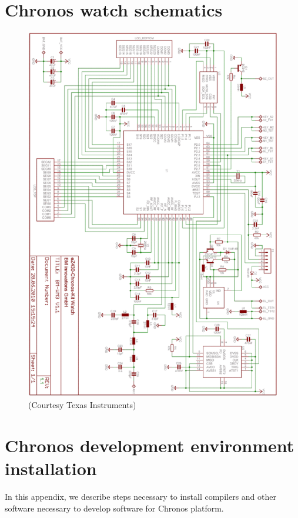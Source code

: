 
\chapter{Chronos watch schematics}
\label{appendix:watch_schematics}

\begin{figure}[h]
  \centering
  \includegraphics[width=1.0\textwidth]{img/watch_schematics.png}
  \caption{(Courtesy Texas Instruments)}
\end{figure}


\chapter{Chronos development environment installation}
\label{appendix:env_install}

In this appendix, we describe steps necessary to install compilers and
other software necessary to develop software for Chronos platform.



